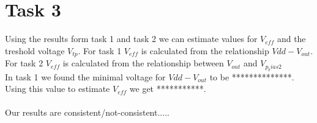 \documentclass[a4paper,english,11pt]{article}
\begin{document}
\section{Task 3}
Using the results form task 1 and task 2 we can estimate values for $V_{eff}$ and the treshold voltage $V_{tp}$.
For task 1 $V_{eff}$ is calculated from the relationship $Vdd - V_{out}$. For task 2 $V_{eff}$ is calculated from the relationship between $V_{out}$ and $V_{p_bias2}$
\\
In task 1 we found the minimal voltage for $Vdd - V_{out}$ to be **************. Using this value to estimate $V_{eff}$ we get ***********.\\
\\
Our results are consistent/not-consistent.....

\newpage
\end{document}
